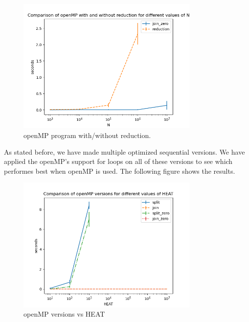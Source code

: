 \documentclass[a4paper]{article}
\begin{document}
\begin{figure}[H]
    \centering
    \includegraphics[width = 0.8\textwidth]{graphs/n/Comparison of openMP with and without reduction for different values of N.png}
    \caption{openMP program with/without reduction.}
    \label{fig: reduction n}
\end{figure}

As stated before, we have made multiple optimized sequential versions. We have applied the openMP's support for loops on all of these versions to see which performes best when openMP is used. The following figure shows the results.

\begin{figure}[H]
    \centering
    \includegraphics[width = 0.8\textwidth]{graphs/heat/Comparison of openMP versions for different values of HEAT.png}
    \caption{openMP versions vs HEAT}
    \label{fig: orig heat}
\end{figure}
\end{document}
